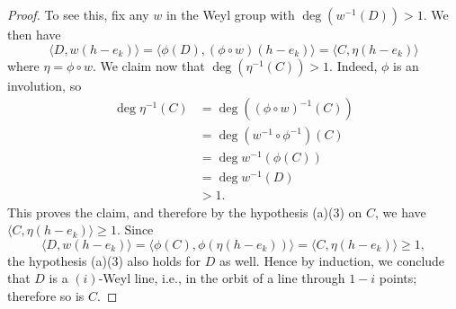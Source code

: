 \documentclass[12pt]{article}
\numberwithin{equation}{section}
\newtheorem{remark}[equation]{Remark}
\numberwithin{equation}{section}
\numberwithin{subeq}{equation}
\begin{document}
\begin{proof}
To see this, fix any $w$ in the Weyl group with $\deg(w^{-1}(D))>1$.
We then have
$$
\langle D, w(h-e_k)\rangle
=\langle \phi(D), (\phi\circ w)(h-e_k)\rangle
= \langle C, \eta(h-e_k)\rangle
$$
where $\eta=\phi \circ w$.
We claim now that $\deg(\eta^{-1}(C))>1$.
Indeed, $\phi$ is an involution, so
\begin{equation}
\begin{split}
  	\deg \eta ^{-1}(C) &=\deg( (\phi \circ w)^{-1}(C))\\
  	&=\deg  (w^{-1} \circ \phi^{-1})(C)\\
  	&=\deg w^{-1} (\phi (C))\\
&=\deg w^{-1}(D)\\
&>1.
\end{split}
\end{equation}
This proves the claim, and
therefore by the hypothesis (a)(3) on $C$, we have $\langle C, \eta(h-e_k)\rangle \geq 1$.
Since
$$
\langle D, w(h-e_k)\rangle = \langle \phi(C), \phi(\eta(h-e_k))\rangle
= \langle C, \eta(h-e_k)\rangle \geq 1,
$$
the hypothesis (a)(3) also holds for $D$ as well.
Hence by induction, we conclude that $D$ is a $(i)$-Weyl line,
i.e., in the orbit of a line through $1-i$ points;
therefore so is $C$.

\end{proof}
 
\end{document}
